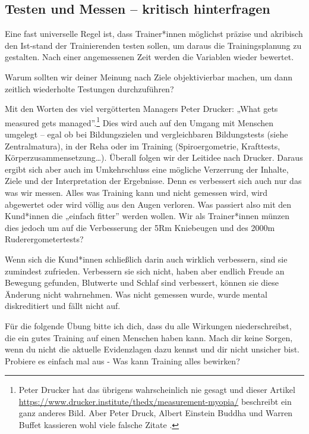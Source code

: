 \documentclass[
  letterpaper,
  DIV=11,
  numbers=noendperiod]{scrreprt}
\begin{document}
\subsection{Testen und Messen -- kritisch
hinterfragen}\label{testen-und-messen-kritisch-hinterfragen}

Eine fast universelle Regel ist, dass Trainer*innen möglichst präzise
und akribisch den Ist-stand der Trainierenden testen sollen, um daraus
die Trainingsplanung zu gestalten. Nach einer angemessenen Zeit werden
die Variablen wieder bewertet.

Warum sollten wir deiner Meinung nach Ziele objektivierbar machen, um
dann zeitlich wiederholte Testungen durchzuführen?

Mit den Worten des viel vergötterten Managers Peter Drucker: „What gets
measured gets managed''.\footnote{Peter Drucker hat das übrigens
  wahrscheinlich nie gesagt und dieser Artikel
  \url{https://www.drucker.institute/thedx/measurement-myopia/}
  beschreibt ein ganz anderes Bild. Aber Peter Druck, Albert Einstein
  Buddha und Warren Buffet kassieren wohl viele falsche Zitate .} Dies
wird auch auf den Umgang mit Menschen umgelegt -- egal ob bei
Bildungszielen und vergleichbaren Bildungstests (siehe Zentralmatura),
in der Reha oder im Training (Spiroergometrie, Krafttests,
Körperzusammensetzung\ldots). Überall folgen wir der Leitidee nach
Drucker. Daraus ergibt sich aber auch im Umkehrschluss eine mögliche
Verzerrung der Inhalte, Ziele und der Interpretation der Ergebnisse.
Denn es verbessert sich auch nur das was wir messen. Alles was Training
kann und nicht gemessen wird, wird abgewertet oder wird völlig aus den
Augen verloren. Was passiert also mit den Kund*innen die „einfach
fitter'' werden wollen. Wir als Trainer*innen münzen dies jedoch um auf
die Verbesserung der 5Rm Kniebeugen und des 2000m Ruderergometertests?

Wenn sich die Kund*innen schließlich darin auch wirklich verbessern,
sind sie zumindest zufrieden. Verbessern sie sich nicht, haben aber
endlich Freude an Bewegung gefunden, Blutwerte und Schlaf sind
verbessert, können sie diese Änderung nicht wahrnehmen. Was nicht
gemessen wurde, wurde mental diskreditiert und fällt nicht auf.

Für die folgende Übung bitte ich dich, dass du alle Wirkungen
niederschreibst, die ein gutes Training auf einen Menschen haben kann.
Mach dir keine Sorgen, wenn du nicht die aktuelle Evidenzlagen dazu
kennst und dir nicht unsicher bist. Probiere es einfach mal aus - Was
kann Training alles bewirken?
\end{document}
